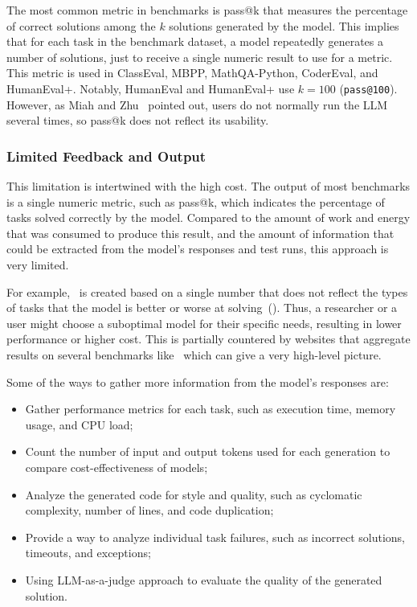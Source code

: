 The most common metric in benchmarks is pass@k that measures the percentage of correct solutions among the $k$ solutions generated by the model.
This implies that for each task in the benchmark dataset, a model repeatedly generates a number of solutions, just to receive a single numeric result to use for a metric.
This metric is used in ClassEval, MBPP, MathQA-Python, CoderEval, and HumanEval+.
Notably, HumanEval and HumanEval+ use $k=100$ (\texttt{pass@100}).
However, as Miah and Zhu~\cite{miah2024usercentricevaluationcode} pointed out, users do not normally run the LLM several times, so pass@k does not reflect its usability.

\subsubsection{Limited Feedback and Output}

This limitation is intertwined with the high cost.
The output of most benchmarks is a single numeric metric, such as pass@k, which indicates the percentage of tasks solved correctly by the model.
Compared to the amount of work and energy that was consumed to produce this result, and the amount of information that could be extracted from the model's responses and test runs, this approach is very limited.

For example,~\cite{swebenchSWEbenchLeaderboards} is created based on a single number that does not reflect the types of tasks that the model is better or worse at solving~(\cite{miah2024usercentricevaluationcode}).
Thus, a researcher or a user might choose a suboptimal model for their specific needs, resulting in lower performance or higher cost.
This is partially countered by websites that aggregate results on several benchmarks like~\cite{vellumLeaderboard2025} which can give a very high-level picture.

Some of the ways to gather more information from the model's responses are:
\begin{itemize}
    \item Gather performance metrics for each task, such as execution time, memory usage, and CPU load;
    \item Count the number of input and output tokens used for each generation to compare cost-effectiveness of models;
    \item Analyze the generated code for style and quality, such as cyclomatic complexity, number of lines, and code duplication;
    \item Provide a way to analyze individual task failures, such as incorrect solutions, timeouts, and exceptions;
    \item Using LLM-as-a-judge approach to evaluate the quality of the generated solution.
\end{itemize}

